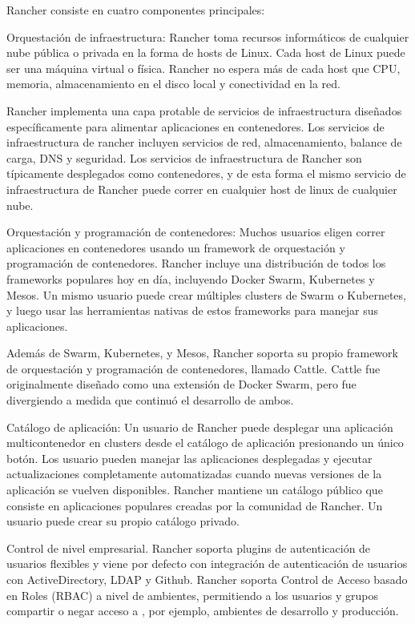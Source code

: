 Rancher consiste en cuatro componentes principales:

Orquestación de infraestructura:
Rancher toma recursos informáticos de cualquier nube pública o privada en la
forma de hosts de Linux. Cada host de Linux puede ser una máquina virtual o
física. Rancher no espera más de cada host que CPU, memoria, almacenamiento en
el disco local y conectividad en la red.

Rancher implementa una capa protable de servicios de infraestructura diseñados
específicamente para alimentar aplicaciones en contenedores. Los servicios de
infraestructura de rancher incluyen servicios de red, almacenamiento, balance
de carga, DNS y seguridad. Los servicios de infraestructura de Rancher son
típicamente desplegados como contenedores, y de esta forma el mismo servicio de
infraestructura de Rancher puede correr en cualquier host de linux de cualquier
nube.

Orquestación y programación de contenedores:
Muchos usuarios eligen correr aplicaciones en contenedores usando un framework
de orquestación y programación de contenedores. Rancher incluye una
distribución de todos los frameworks populares hoy en día, incluyendo Docker
Swarm, Kubernetes y Mesos. Un mismo usuario puede crear múltiples clusters de
Swarm o Kubernetes, y luego usar las herramientas nativas de estos frameworks
para manejar sus aplicaciones.

Además de Swarm, Kubernetes, y Mesos, Rancher soporta su propio framework de
orquestación y programación de contenedores, llamado Cattle. Cattle fue
originalmente diseñado como una extensión de Docker Swarm, pero fue divergiendo
a medida que continuó el desarrollo de ambos.

Catálogo de aplicación:
Un usuario de Rancher puede desplegar una aplicación multicontenedor en
clusters desde el catálogo de aplicación presionando un único botón. Los
usuario pueden manejar las aplicaciones desplegadas y ejecutar actualizaciones
completamente automatizadas cuando nuevas versiones de la aplicación se vuelven
disponibles. Rancher mantiene un catálogo público que consiste en aplicaciones
populares creadas por la comunidad de Rancher. Un usuario puede crear su propio
catálogo privado.

Control de nivel empresarial.
Rancher soporta plugins de autenticación de usuarios flexibles y viene por
defecto con integración de autenticación de usuarios con ActiveDirectory, LDAP
y Github. Rancher soporta Control de Acceso basado en Roles (RBAC) a nivel de
ambientes, permitiendo a los usuarios y grupos compartir o negar acceso a , por
ejemplo, ambientes de desarrollo y producción.

\clearpage
